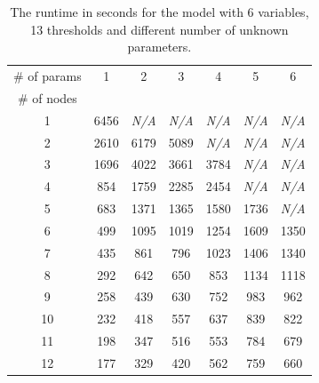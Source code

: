 \documentclass[12pt,oneside,draft]{fithesis2}
\begin{document}
				\begin{table}
				\label{tab:param}
					\centering
					\setlength{\tabcolsep}{6pt}
					\begin{tabular}{|*{7}{c|}}
						\hline
							\# of params	& 1 	& 2 	& 3	& 4	& 5	& 6	\\
						\cline{1-1}
							\# of nodes	&	&	&	&	&	&	\\
						\hline
							1 & 6456	& {\em N/A} & {\em N/A} & {\em N/A} & {\em N/A} & {\em N/A} \\
							2	& 2610		& 6179			& 5089			& 	{\em N/A}				&	{\em N/A}					&	{\em N/A}					\\
							3	&	1696		&	4022			&	3661			&	3784			&	{\em N/A}					&	{\em N/A}					\\
							4	&	854			&	1759			&	2285			&	2454			&	{\em N/A}					&	{\em N/A}					\\
							5	&	683			&	1371			&	1365			&	1580			&	1736			&	{\em N/A}					\\
							6	&	499			&	1095			&	1019			&	1254			&	1609			&	1350			\\
							7	&	435			&	861				&	796				&	1023			&	1406			&	1340			\\
							8	&	292			&	642				&	650				&	853				&	1134			&	1118			\\
							9	&	258			&	439				&	630				&	752				&	983				&	962				\\
						 	10	&	232			&	418				&	557				& 637				&	839				&	822				\\
							11	&	198			&	347				&	516				&	553				&	784				&	679				\\
							12	&	177			&	329				&	420				&	562				&	759				&	660				\\
						\hline
					\end{tabular}\\[1em]
					\caption{The runtime in seconds for the model with 6 variables, 13 thresholds and different number of unknown parameters.}				
			\end{table}
\end{document}
